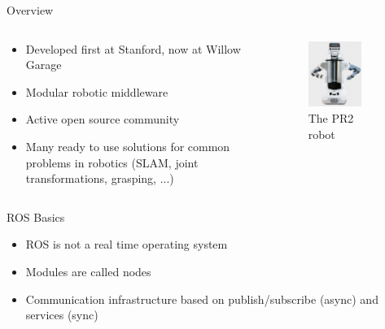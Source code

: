 \documentclass[compress]{beamer}
\begin{document}
\begin{frame}{Overview}

\begin{columns}
\begin{column}{.6\textwidth}
\begin{itemize}
\item Developed first at Stanford, now at Willow Garage
\item Modular robotic middleware
\item Active open source community
\item Many ready to use solutions for common problems in robotics (SLAM, joint transformations, grasping, ...)
\end{itemize}
\end{column}%
\hfill%
\begin{column}{.48\textwidth}
\begin{figure}[t]
    \centering
    \includegraphics[width=0.7\textwidth]{images/pr2.png}
    \caption[The PR2 robot]{The PR2 robot}
\end{figure}
\end{column}%
\end{columns}
\end{frame}

\begin{frame}{ROS Basics}
\begin{itemize}
\item ROS is not a real time operating system
\item Modules are called nodes
\item Communication infrastructure based on publish/subscribe (async) and services (sync)
\end{itemize}
\end{frame}
\end{document}
